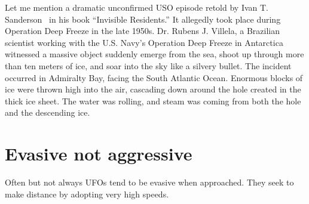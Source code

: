 Let me mention a dramatic unconfirmed USO episode retold by Ivan T. Sanderson~\cite[Chapter~1]{Sanderson-invisibeRes} in his book ``Invisible Residents.'' It allegedly took place during Operation Deep Freeze in the late 1950s. Dr. Rubens J. Villela, a Brazilian scientist working with the U.S. Navy's Operation Deep Freeze in Antarctica witnessed a massive object suddenly emerge from the sea, shoot up through more than ten meters of ice, and soar into the sky like a silvery bullet. The incident occurred in Admiralty Bay, facing the South Atlantic Ocean. Enormous blocks of ice were thrown high into the air, cascading down around the hole created in the thick ice sheet. The water was rolling, and steam was coming from both the hole and the descending ice.


\section{Evasive not aggressive}

Often but not always UFOs tend to be evasive when approached. They seek to make distance by adopting very high speeds.
